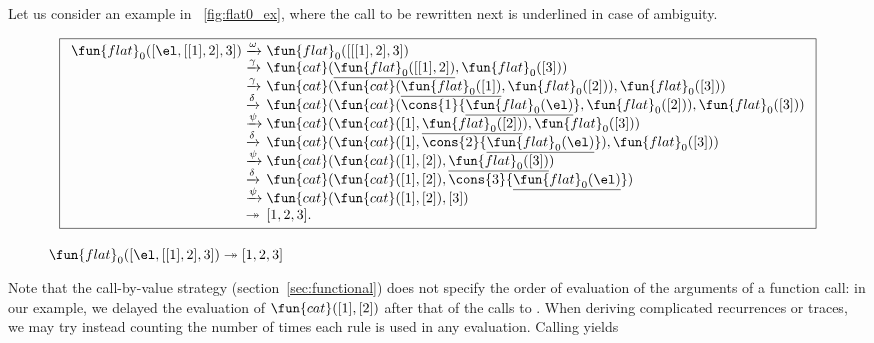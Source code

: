Let us consider an example in \fig~\vref{fig:flat0_ex}, where the call
to be rewritten next is underlined in case of ambiguity.
\begin{figure}[!b]
\begin{equation*}
\boxed{%
\begin{array}{r@{\;}l@{\;}l}
\fun{flat}_0([\el,[[1],2],3])
& \xrightarrow{\smash{\omega}}
& \fun{flat}_0([[[1],2],3])\\
& \xrightarrow{\smash{\gamma}}
& \fun{cat}(\underline{\fun{flat}_0([[1],2])},\fun{flat}_0([3]))\\
& \xrightarrow{\smash{\gamma}}
& \fun{cat}(\fun{cat}(\underline{\fun{flat}_0([1])},\fun{flat}_0([2])),\fun{flat}_0([3]))\\
& \xrightarrow{\smash{\delta}}
& \fun{cat}(\fun{cat}(\cons{1}{\underline{\fun{flat}_0(\el)}},\fun{flat}_0([2])),\fun{flat}_0([3]))\\
& \xrightarrow{\smash{\psi}}
& \fun{cat}(\fun{cat}([1],\underline{\fun{flat}_0([2])}),\fun{flat}_0([3]))\\
& \xrightarrow{\smash{\delta}}
& \fun{cat}(\fun{cat}([1],\cons{2}{\underline{\fun{flat}_0(\el)}}),\fun{flat}_0([3]))\\
& \xrightarrow{\smash{\psi}}
& \fun{cat}(\fun{cat}([1],[2]),\underline{\fun{flat}_0([3])})\\
& \xrightarrow{\smash{\delta}}
& \fun{cat}(\fun{cat}([1],[2]),\cons{3}{\underline{\fun{flat}_0(\el)}})\\
& \xrightarrow{\smash{\psi}}
& \fun{cat}(\fun{cat}([1],[2]),[3])\\
& \twoheadrightarrow & [1,2,3].
\end{array}
}
\end{equation*}
\caption{\(\fun{flat}_0([\el,[[1],2],3]) \twoheadrightarrow [1,2,3]\)}
\label{fig:flat0_ex}
\end{figure}
Note that the call\hyp{}by\hyp{}value strategy (section~\ref{sec:functional}) does
not specify the order of evaluation of the arguments of a function
call: in our example, we delayed the evaluation of
\(\fun{cat}([1],[2])\)  after that of the
calls to . When
deriving complicated recurrences or traces, we may try instead
counting the number of times each rule is used in any
evaluation. Calling 
yields
